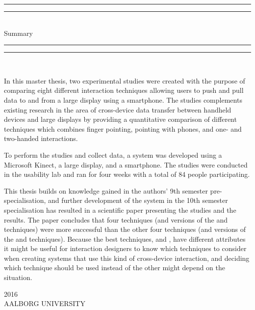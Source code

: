 \begin{dummy}

	\textheight
	\centering
	\vspace*{\baselineskip}
	\rule{\textwidth}{2pt}\vspace*{-\baselineskip}\vspace*{2pt}
	\rule{\textwidth}{0.4pt}\\[\baselineskip]
	{\LARGE Summary}\\[0.2\baselineskip]
	\rule{\textwidth}{0.4pt}\vspace*{-\baselineskip}\vspace{3.2pt}
	\rule{\textwidth}{2pt}\\[\baselineskip]
	\scshape
	{} \par
	\vspace*{0.7\baselineskip}

\begin{summary}
In this master thesis, two experimental studies were created with the purpose of comparing eight different interaction techniques allowing users to push and pull data to and from a large display using a smartphone.
The studies complements existing research in the area of cross-device data transfer between handheld devices and large displays by providing a quantitative comparison of different techniques which combines finger pointing, pointing with phones, and one- and two-handed interactions.

To perform the studies and collect data, a system was developed using a Microsoft Kinect, a large display, and a smartphone.
The studies were conducted in the usability lab and ran for four weeks with a total of 84 people participating. 

This thesis builds on knowledge gained in the authors' 9th semester pre-specialisation, and further development of the system in the 10th semester specialisation has resulted in a scientific paper presenting the studies and the results.
The paper concludes that four techniques (\pull and \push versions of the \swipe and \throw techniques) were more successful than the other four techniques (\pull and \push versions of the \grab and \tilt techniques).
Because the best techniques, \swipe and \throw, have different attributes it might be useful for interaction designers to know which techniques to consider when creating systems that use this kind of cross-device interaction, and deciding which technique should be used instead of the other might depend on the situation.
\end{summary}
	\vspace*{2\baselineskip}
		{\scshape 2016} \\
		{\large AALBORG UNIVERSITY}\par
	
\end{dummy}